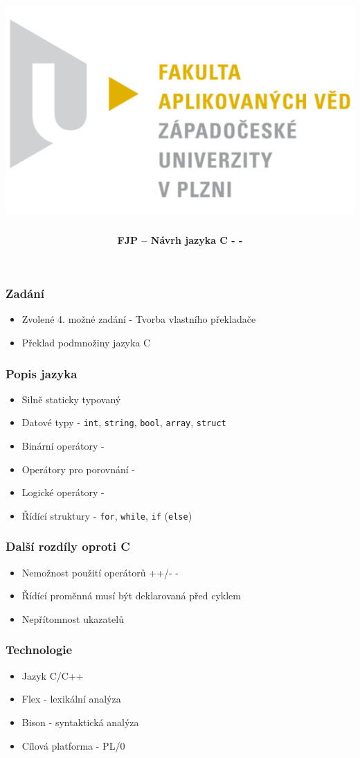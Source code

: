 \documentclass[xcolor=dvipsnames]{beamer}
\title[Západočeská univerzita v Plzni]{\includegraphics[width=\textwidth/4]{img/logo.png}}
\author[Jindřiška Reismüllerová \& Stanislav Král]{ \textbf{FJP -- Návrh jazyka C - -}}
\institute{}
\begin{document}
\begin{frame}
  \titlepage
\end{frame}

\begin{frame}
\frametitle{\textbf{Zadání}}
	\begin{itemize}
    		\item Zvolené 4. možné zadání - Tvorba vlastního překladače
    		\item Překlad podmnožiny     jazyka C
    
  	\end{itemize}
\end{frame}


\begin{frame}
\frametitle{\textbf{Popis jazyka}}
	\begin{itemize}
    		\item Silně staticky typovaný
    		\item Datové typy - \texttt{int}, \texttt{string}, \texttt{bool}, \texttt{array}, \texttt{struct}
    		\item Binární operátory - \uv{+-*/}
    		\item Operátory pro porovnání - \uv{$<,  >,   ==,  <=,  >= ,  !=$}
    		\item Logické operátory - \uv{$||$, \&\&}
    		\item Řídící struktury - \texttt{for}, \texttt{while}, \texttt{if} (\texttt{else})
  	\end{itemize}
\end{frame}

\begin{frame}
\frametitle{\textbf{Další rozdíly oproti C}}
	\begin{itemize}
    		\item Nemožnost použití operátorů ++/- -
    		\item Řídící proměnná musí být deklarovaná před cyklem
    		\item Nepřítomnost ukazatelů
  	\end{itemize}
\end{frame}

\begin{frame}
\frametitle{\textbf{Technologie}}
	\begin{itemize}
    		\item Jazyk C/C++
    		\item Flex - lexikální analýza
    		\item Bison - syntaktická analýza
    		\item Cílová platforma -  PL/0
  	\end{itemize}
\end{frame}
\end{document}
